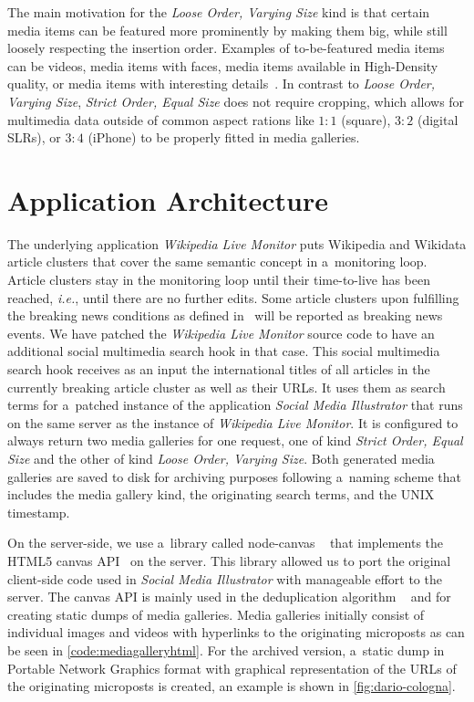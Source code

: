 \documentclass{sig-alternate}
\begin{document}
The main motivation for the \emph{Loose Order, Varying Size} kind
is that certain media items can be featured more prominently
by making them big, while still loosely respecting the insertion order.
Examples of to-be-featured media items can be videos,
media items with faces, media items available in High-Density quality,
or media items with interesting details~\cite{suh2003thumbnail}.
In contrast to \emph{Loose Order, Varying Size},
\emph{Strict Order, Equal Size} does not require cropping,
which allows for multimedia data outside of common aspect rations like
$1{:}1$ (square), $3{:}2$ (digital SLRs), or $3{:}4$ (iPhone)
to be properly fitted in media galleries.

\section{Application Architecture}
\label{sec:application-architecture}
\selectfont

The underlying application \emph{Wikipedia Live Monitor}
puts Wiki\-pedia and Wikidata article clusters
that cover the same semantic concept
in a~monitoring loop.
Article clusters stay in the monitoring loop until
their time-to-live has been reached,
\emph{i.e.}, until there are no further edits.
Some article clusters upon fulfilling the breaking news conditions
as defined in~\cite{steiner2013mjnomore}
will be reported as breaking news events.
We have patched the \emph{Wikipedia Live Monitor} source code
to have an additional social multimedia search hook in that case.
This social multimedia search hook receives as an input
the international titles of all articles
in the currently breaking article cluster as well as their URLs.
It uses them as search terms for a~patched instance
of the application \emph{Social Media Illustrator}
that runs on the same server
as the instance of \emph{Wikipedia Live Monitor}.
It is configured to always return two media galleries
for one request, one of kind \emph{Strict Order, Equal Size}
and the other of kind \emph{Loose Order, Varying Size}.
Both generated media galleries are saved to disk
for archiving purposes following a~naming scheme
that includes the media gallery kind,
the originating search terms, and the UNIX timestamp.

On the server-side, we use a~library called node-canvas%
~\cite{holowaychuk2013nodecanvas} that implements the
HTML5 canvas API~\cite{cabanier2013canvas} on the server.
This library allowed us to port the original client-side code 
used in \emph{Social Media Illustrator}
with manageable effort to the server.
The canvas API is mainly used in the deduplication algorithm%
~\cite{steiner2013clustering}
and for creating static dumps of media galleries.
Media galleries initially consist of individual images and videos
with hyperlinks to the originating microposts
as can be seen in \autoref{code:mediagalleryhtml}.
For the archived version, a~static dump
in Portable Network Graphics format
with graphical representation of the URLs
of the originating microposts is created,
an example is shown in \autoref{fig:dario-cologna}.
\end{document}
